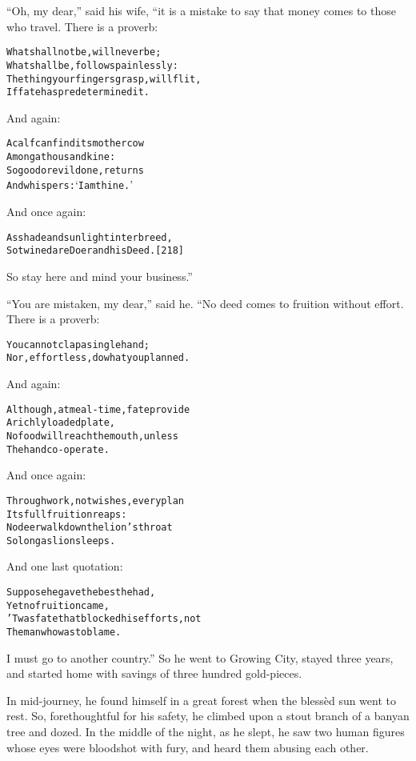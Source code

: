 \documentclass{article}
\renewenvironment{verbatim}{\begin{alltt}\normalfont\begin{centering}}{\end{centering}\end{alltt}}
\begin{document}
``Oh, my dear,'' said his wife, “it is a mistake to say that money
comes to those who travel. There is a proverb:

\begin{verbatim}
What shall not be, will never be;
What shall be, follows painlessly:
The thing your fingers grasp, will flit,
If fate has predetermined it.
\end{verbatim}
And again:

\begin{verbatim}
A calf can find its mother cow
    Among a thousand kine:
So good or evil done, returns
    And whispers: ‘I am thine.’
\end{verbatim}
And once again:

\begin{verbatim}
As shade and sunlight interbreed,
So twined are Doer and his Deed.                        [218]
\end{verbatim}
So stay here and mind your business.”

``You are mistaken, my dear,'' said he. “No deed comes to fruition
without effort. There is a proverb:

\begin{verbatim}
You cannot clap a single hand;
Nor, effortless, do what you planned.
\end{verbatim}
And again:

\begin{verbatim}
Although, at meal-time, fate provide
    A richly loaded plate,
No food will reach the mouth, unless
    The hand co-operate.
\end{verbatim}
And once again:

\begin{verbatim}
Through work, not wishes, every plan
    Its full fruition reaps:
No deer walk down the lion's throat
    So long as lion sleeps.
\end{verbatim}
And one last quotation:

\begin{verbatim}
Suppose he gave the best he had,
    Yet no fruition came,
'Twas fate that blocked his efforts, not
    The man who was to blame.
\end{verbatim}
I must go to another country.” So he went to Growing City, stayed
three years, and started home with savings of three hundred
gold-pieces.

In mid-journey, he found himself in a great forest when the blessèd
sun went to rest. So, forethoughtful for his safety, he climbed
upon a stout branch of a banyan tree and dozed. In the middle of
the night, as he slept, he saw two human figures whose eyes were
bloodshot with fury, and heard them abusing each other.
\end{document}
